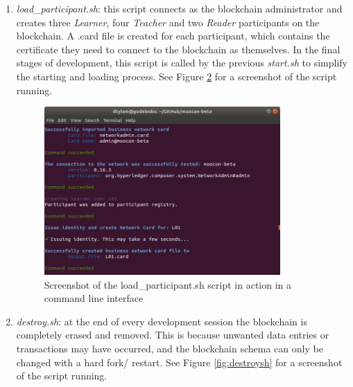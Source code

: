 \begin{enumerate}
\begin{figure}[!ht]
		      \label{fig:startsh}
	      \end{figure}
	\item \textit{load\_participant.sh}: this script connects as the blockchain administrator and creates
	      three \textit{Learner}, four \textit{Teacher} and two \textit{Reader} participants on the blockchain.
	      A .card file is created for each participant, which contains the certificate they need to
	      connect to the blockchain as themselves. In the final stages of development, this script is called by
	      the previous \textit{start.sh} to simplify the starting and loading process.
	      See Figure \ref{fig:load_participantsh} for a screenshot of the script running.
	      \begin{figure}[!ht]
		      \centering
		      \includegraphics[width=0.85\textwidth]{load_participantsh}
		      \caption[Participant Loading Script Screenshot]
		      {Screenshot of the load\_participant.sh script in action in a command line interface}
		      \label{fig:load_participantsh}
	      \end{figure}
	\item \textit{destroy.sh}: at the end of every development session the blockchain is completely
	      erased and removed. This is because unwanted data entries or transactions may have occurred, and
	      the blockchain schema can only be changed with a hard fork/ restart.
	      See Figure \ref{fig:destroysh} for a screenshot of the script running.
	      \begin{figure}[!ht]
		      \centering

\end{figure}
\end{enumerate}
